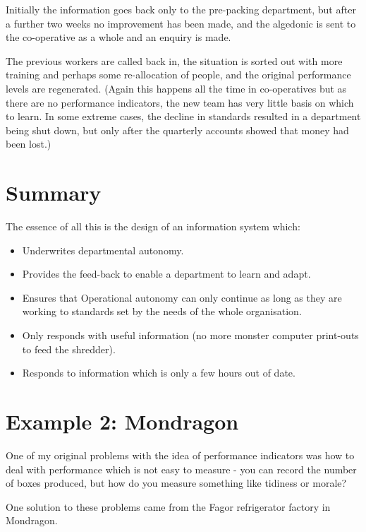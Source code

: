 Initially the information goes back only to the pre-packing department, but after a further two weeks no improvement has been made, and the algedonic is sent to the co-operative as a whole and an enquiry is made.

The previous workers are called back in, the situation is sorted out with more training and perhaps some re-allocation of people, and the original performance levels are regenerated. (Again this happens all the time in co-operatives but as there are no performance indicators, the new team has very little basis on which to learn. In some extreme cases, the decline in standards resulted in a department being shut down, but only after the quarterly accounts showed that money had been lost.)

\section*{Summary}
The essence of all this is the design of an information system which:

\begin{itemize}
  \item Underwrites departmental autonomy.

  \item Provides the feed-back to enable a department to learn and adapt.

  \item Ensures that Operational autonomy can only continue as long as they are working to standards set by the needs of the whole organisation.

  \item Only responds with useful information (no more monster computer print-outs to feed the shredder).

  \item Responds to information which is only a few hours out of date.

\end{itemize}

\section*{Example 2: Mondragon}
One of my original problems with the idea of performance indicators was how to deal with performance which is not easy to measure - you can record the number of boxes produced, but how do you measure something like tidiness or morale?

One solution to these problems came from the Fagor refrigerator factory in Mondragon.

